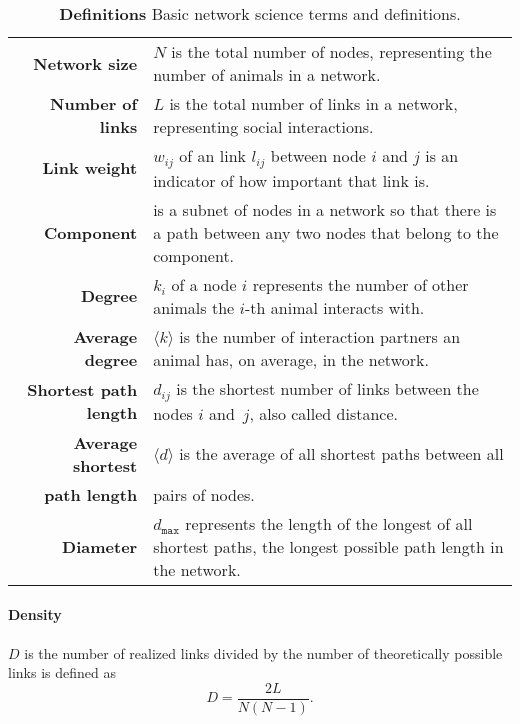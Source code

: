 \begin{table}[!tp]
\small
\caption[Definitions]{\textbf{Definitions} Basic network science terms and definitions.}
\label{tab:theory}
\vspace{3mm}
\colorbox{usethiscolorhere}{
\centering
\begin{tabularx}{\textwidth}{@{} r Y @{}}
	\textbf{Network size} &
	$N$ is the total number of nodes, representing the number of animals in a network.\vspace{2mm}\\
	\textbf{Number of links} &
	$L$ is the total number of links in a network, representing social interactions.\vspace{2mm}\\
	\textbf{Link weight} &
	$w_{ij}$ of an link $l_{ij}$ between node $i$ and $j$ is an indicator of how important that link is.\vspace{2mm}\\
	\textbf{Component} &
	is a subnet of nodes in a network so that there is a path between any two nodes that belong to the component.\vspace{2mm}\\
	\textbf{Degree} &
	$k_i$ of a node $i$ represents the number of other animals the $i$-th animal interacts with.\vspace{2mm}\\
	\textbf{Average degree} &
	$\langle k \rangle$ is the number of interaction partners an animal has, on average, in the network.\vspace{2mm}\\
	\textbf{Shortest path length} & $d_{ij}$ is the shortest number of links between the nodes $i$ and~$j$, also called distance.\vspace{2mm}\\

	\textbf{Average shortest} & $\langle d \rangle$ is the average of all shortest paths between all\\
	\textbf{path length} & pairs of nodes.\vspace{2mm}\\
	\textbf{Diameter} & $d_{\texttt{max}}$ represents the length of the longest of all shortest paths, the longest possible path length in the network.\\
\end{tabularx}
}
\end{table}

\paragraph{Density} $D$ is the number of realized links divided by the number
of theoretically possible links is defined as
\begin{equation}
\label{eq:density}
D=\frac{2L}{N(N-1)}.
\end{equation}

